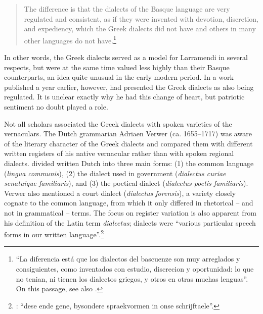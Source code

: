 \begin{quote}
The difference is that the dialects of the Basque language are very regulated and consistent, as if they were invented with devotion, discretion, and expediency, which the Greek dialects did not have and others in many other languages do not have.\footnote{“La diferencia está que los dialectos del bascuenze son muy arreglados y consiguientes, como inventados con estudio, discrecion y oportunidad: lo que no tenian, ni tienen los dialectos griegos, y otros en otras muchas lenguas”. On this passage, see also \citet[876]{Hasler2009}.}
\end{quote}

In other words, the Greek dialects served as a model for Larramendi in several respects, but were at the same time valued less highly than their Basque counterparts, an idea quite unusual in the early modern period. In a work published a year earlier, however, \citet[142]{Larramendi1728} had presented the Greek dialects as also being regulated. It is unclear exactly why he had this change of heart, but patriotic sentiment no doubt played a role.

Not all scholars associated the Greek dialects with spoken varieties of the vernaculars. The Dutch grammarian Adriaen Verwer (ca. 1655–1717) was aware of the literary character of the Greek dialects and compared them with different written registers of his native vernacular rather than with spoken regional dialects. \citet[53--54]{Verwer1707} divided written Dutch into three main forms: (1) the common language (\textit{lingua communis}), (2) the dialect used in government (\textit{dialectus curiae senatuique familiaris}), and (3) the poetical dialect (\textit{dialectus poetis familiaris}). Verwer also mentioned a court dialect (\textit{dialectus forensis}), a variety closely cognate to the common language, from which it only differed in rhetorical – and not in grammatical – terms. The focus on register variation is also apparent from his definition of the Latin term \textit{dialectus}; dialects were “various particular speech forms in our written language”.\footnote{\citet[53]{Verwer1707}: “dese ende gene, bysondere spraekvormen in onse schrijftaele”.}

